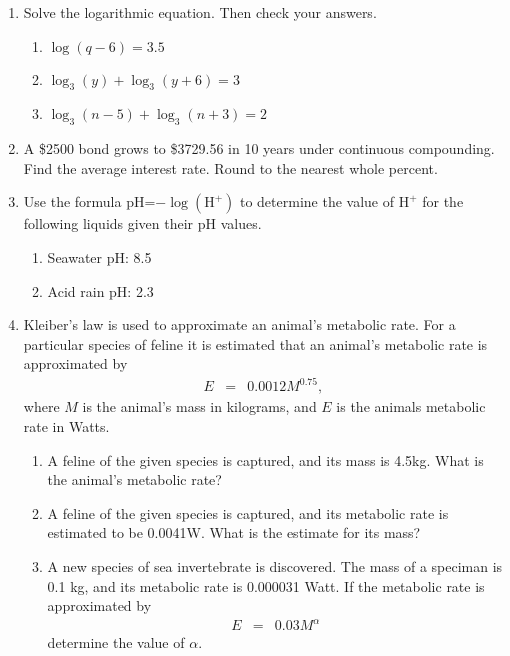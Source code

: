 \begin{enumerate}
\item Solve the logarithmic equation.  Then check your answers.
  \begin{enumerate}
  \item $\log(q-6)=3.5$\vfill
  \item $\log_3(y)+\log_3(y+6)=3$\vfill
  \item $\log_3(n-5)+\log_3(n+3)=2$\vfill
  \end{enumerate}
\item A \$2500 bond grows to \$3729.56 in 10 years under continuous
  compounding.  Find the average interest rate.  Round to the nearest
  whole percent.
  \vfill
\item Use the formula pH=$-\log(\text{H}^+)$ to determine the value of $\text{H}^+$ for the following liquids given their pH values.
\begin{enumerate}
\item Seawater pH:  8.5 \vfill
\item Acid rain pH:  2.3\vfill
\end{enumerate}

\item Kleiber's law is used to approximate an animal's metabolic
  rate. For a particular species of feline it is estimated that an
  animal's metabolic rate is approximated by
  \begin{eqnarray*}
    E & = & 0.0012 M^{0.75},
  \end{eqnarray*}
  where $M$ is the animal's mass in kilograms, and $E$ is the animals
  metabolic rate in Watts.

  \begin{enumerate}
  \item A feline of the given species is captured, and its mass is
    4.5kg. What is the animal's metabolic rate?
  \item A feline of the given species is captured, and its metabolic
    rate is estimated to be 0.0041W. What is the estimate for its
    mass?
  \item A new species of sea invertebrate is discovered. The mass of a
    speciman is 0.1 kg, and its metabolic rate is 0.000031 Watt. If
    the metabolic rate is approximated by
    \begin{eqnarray*}
      E & = & 0.03 M^\alpha
    \end{eqnarray*}
    determine the value of $\alpha$.
  \end{enumerate}

\end{enumerate}
